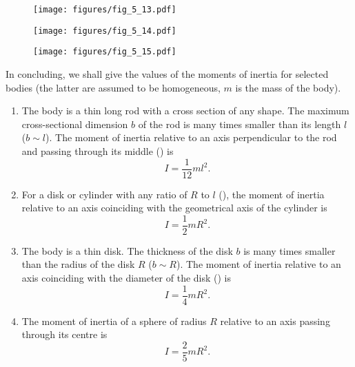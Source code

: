 \begin{figure}[t]
	\begin{minipage}[t]{0.5\linewidth}
		\begin{center}
			\texttt{[image: figures/fig\_5\_13.pdf]}
			\caption[]{}
			\label{fig:5_13}
		\end{center}
	\end{minipage}
	\hspace{-0.05cm}
	\begin{minipage}[t]{0.5\linewidth}
		\begin{center}
			\texttt{[image: figures/fig\_5\_14.pdf]}
			\caption[]{}
			\label{fig:5_14}
		\end{center}
	\end{minipage}
\end{figure}

\begin{figure}[t]
	\begin{center}
		\texttt{[image: figures/fig\_5\_15.pdf]}
		\caption[]{}
		\label{fig:5_15}
	\end{center}
	\vspace{-1.0cm}
\end{figure}

In concluding, we shall give the values of the moments of inertia for selected bodies (the latter are assumed to be homogeneous, $m$ is the mass of the body).
\begin{enumerate}[1.]
	\item The body is a thin long rod with a cross section of any shape. The maximum cross-sectional dimension $b$ of the rod is many times smaller than its length $l$ ($b\sim l$). The moment of inertia relative to an axis perpendicular to the rod and passing through its middle () is
	\begin{equation}\label{eq:5_25}
	I = \frac{1}{12}ml^2.
	\end{equation}

	\item For a disk or cylinder with any ratio of $R$ to $l$ (), the moment of inertia relative to an axis coinciding with the geometrical axis of the cylinder is
	\begin{equation}\label{eq:5_26}
	I = \frac{1}{2}mR^2.
	\end{equation}

	\item The body is a thin disk. The thickness of the disk $b$ is many times smaller than the radius of the disk $R$ ($b\sim R$). The moment of inertia relative to an axis coinciding with the diameter of the disk () is
	\begin{equation}\label{eq:5_27}
		I = \frac{1}{4}mR^2.
	\end{equation}

	\item The moment of inertia of a sphere of radius $R$  relative to an axis passing through its centre is
	\begin{equation}\label{eq:5_28}
		I = \frac{2}{5}mR^2.
	\end{equation}
\end{enumerate}

